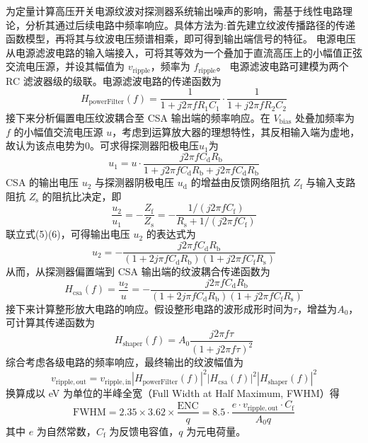 \documentclass[twocolumn]{ctexart}
\begin{document}
为定量计算高压开关电源纹波对探测器系统输出噪声的影响，需基于线性电路理论，分析其通过后续电路中频率响应\cite{13}。具体方法为:首先建立纹波传播路径的传递函数模型，再将其与纹波电压频谱相乘，即可得到输出端信号的特征。
电源电压从电源滤波电路的输入端接入，可将其等效为一个叠加于直流高压上的小幅值正弦交流电压源，并设其幅值为 $v_{\mathrm{ripple}}$，频率为 $f_{\mathrm{ripple}}$。
电源滤波电路可建模为两个 RC 滤波器级的级联。电源滤波电路的传递函数为
\begin{equation}
H_\text{powerFilter}(f) = \frac{1}{1 + j2\pi f R_1 C_1} \cdot \frac{1}{1 + j2\pi f R_2 C_2}
\end{equation}
接下来分析偏置电压纹波耦合至 CSA 输出端的频率响应。在 $V_{\mathrm{bias}}$ 处叠加频率为 $f$ 的小幅值交流电压源 $u$，考虑到运算放大器的理想特性，其反相输入端为虚地，故认为该点电势为0。可求得探测器阳极电压$u_1$为
\begin{equation}
u_1 = u \cdot \frac{j2\pi f C_{\mathrm{d}} R_{\mathrm{b}}}{1 + j2\pi f C_{\mathrm{d}} R_{\mathrm{b}} + j2\pi f C_{\mathrm{d}} R_{\mathrm{b}}}
\end{equation}
CSA 的输出电压 $u_2$ 与探测器阴极电压 $u_{\mathrm{d}}$ 的增益由反馈网络阻抗 $Z_{\mathrm{f}}$ 与输入支路阻抗 $Z_{\mathrm{s}}$ 的阻抗比决定，即
\begin{equation}
\frac{u_2}{u_1} = -\frac{Z_{\mathrm{f}}}{Z_{\mathrm{s}}} = - \frac{1 / (j2\pi f C_{\mathrm{f}})}{R_{\mathrm{s}} + 1/(j2\pi f C_{\mathrm{f}})}
\end{equation}
联立式(5)(6)，可得输出电压 $u_2$ 的表达式为
\begin{equation}
u_2 = - \frac{j2\pi f C_{\mathrm{d}} R_{\mathrm{b}}}{(1 + 2j\pi f C_{\mathrm{d}} R_{\mathrm{b}})(1 + j2\pi f C_{\mathrm{f}}R_{\mathrm{s}})}
\end{equation}
从而，从探测器偏置端到 CSA 输出端的纹波耦合传递函数为
\begin{equation}
H_\text{csa}(f) = \frac{u_2}{u} = - \frac{j2\pi f C_{\mathrm{d}} R_{\mathrm{b}}}{(1 + 2j\pi f C_{\mathrm{d}} R_{\mathrm{b}})(1 + j2\pi f C_{\mathrm{f}}R_{\mathrm{s}})}
\end{equation}
接下来计算整形放大电路的响应。假设整形电路的波形成形时间为$\tau$，增益为$A_0$，可计算其传递函数为
\begin{equation}
H_\text{shaper}(f) = A_0 \frac{j2\pi f \tau}{(1 + j2\pi f \tau)^2}
\end{equation}
综合考虑各级电路的频率响应，最终输出的纹波幅值为
\begin{equation}
v_{\mathrm{ripple,out}} = v_{\mathrm{ripple,in}} |H_\text{powerFilter}(f)|^2 |H_\text{csa}(f)|^2 |H_\text{shaper}(f)|^2
\end{equation}
换算成以 eV 为单位的半峰全宽（Full Width at Half Maximum, FWHM）\cite{14}得
\begin{equation}
\mathrm{FWHM} = 2.35\times3.62\times \frac{\mathrm{ENC}}{q} = 8.5 \cdot \frac{e\cdot v_{\mathrm{ripple,out}} \cdot C_{\mathrm{f}}}{A_0q}
\end{equation}
其中 $e$ 为自然常数，$C_{\mathrm{f}}$ 为反馈电容值，$q$ 为元电荷量。
\end{document}
